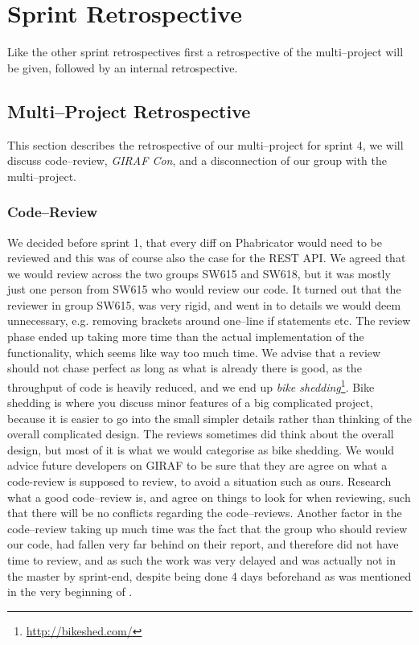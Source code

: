 \section{Sprint Retrospective}
\label{sec:S4retro} %

Like the other sprint retrospectives first a retrospective of the multi--project will be given, followed by an internal retrospective.

\subsection*{Multi--Project Retrospective}
This section describes the retrospective of our multi--project for sprint 4, we will discuss code--review, \textit{GIRAF Con}, and a disconnection of our group with the multi--project.

\subsubsection*{Code--Review}
We decided before sprint 1, that every diff on Phabricator would need to be reviewed and this was of course also the case for the REST API.
We agreed that we would review across the two groups SW615 and SW618, but it was mostly just one person from SW615 who would review our code.
It turned out that the reviewer in group SW615, was very rigid, and went in to details we would deem unnecessary, e.g. removing brackets around one--line if statements etc.
The review phase ended up taking more time than the actual implementation of the functionality, which seems like way too much time.
We advise that a review should not chase perfect as long as what is already there is good, as the throughput of code is heavily reduced, and we end up \textit{bike shedding}\footnote{\url{http://bikeshed.com/}}.
Bike shedding is where you discuss minor features of a big complicated project, because it is easier to go into the small simpler details rather than thinking of the overall complicated design.
The reviews sometimes did think about the overall design, but most of it is what we would categorise as bike shedding.
We would advice future developers on GIRAF to be sure that they are agree on what a code-review is supposed to review, to avoid a situation such as ours.
Research what a good code--review is, and agree on things to look for when reviewing, such that there will be no conflicts regarding the code--reviews.
Another factor in the code--review taking up much time was the fact that the group who should review our code, had fallen very far behind on their report, and therefore did not have time to review, and as such the work was very delayed and was actually not in the master by sprint-end, despite being done 4 days beforehand as was mentioned in the very beginning of .


